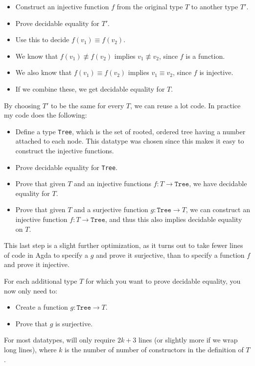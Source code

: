 \begin{itemize}
\item Construct an injective function $f$ from the original type $T$ to another
  type $T'$.
\item Prove decidable equality for $T'$.
\item Use this to decide $f(v_1) \equiv f(v_2)$.
\item We know that $f(v_1) \not\equiv f(v_2)$ implies $v_1 \not\equiv v_2$,
  since $f$ is a function.
\item We also know that $f(v_1) \equiv f(v_2)$ implies $v_1 \equiv v_2$, since
  $f$ is injective.
\item If we combine these, we get decidable equality for $T$.
\end{itemize}

By choosing $T'$ to be the same for every $T$, we can reuse a lot code. In
practice my code does the following:

\begin{itemize}
\item Define a type \texttt{Tree}, which is the set of rooted, ordered tree
  having a number attached to each node. This datatype was chosen since this
  makes it easy to construct the injective functions.
\item Prove decidable equality for \texttt{Tree}.
\item Prove that given $T$ and an injective functions $f : T \to \mathtt{Tree}$,
  we have decidable equality for $T$.
\item Prove that given $T$ and a surjective function $g : \mathtt{Tree} \to T$,
  we can construct an injective function $f : T \to \mathtt{Tree}$, and thus
  this also implies decidable equality on $T$.
\end{itemize}

This last step is a slight further optimization, as it turns out to take fewer
lines of code in Agda to specify a $g$ and prove it surjective, than to specify
a function $f$ and prove it injective.

For each additional type $T$ for which you want to prove decidable equality, you
now only need to:

\begin{itemize}
\item Create a function $g : \mathtt{Tree} \to T$.
\item Prove that $g$ is surjective.
\end{itemize}

For most datatypes, will only require $2k+3$ lines (or slightly more if we wrap
long lines), where $k$ is the number of number of constructors in the definition
of $T$.

